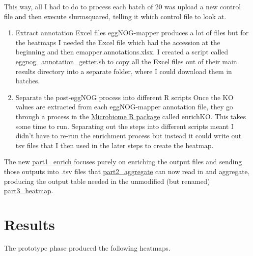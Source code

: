 \documentclass[
  letterpaper,
  DIV=11,
  numbers=noendperiod]{scrreprt}
\begin{document}
This way, all I had to do to process each batch of 20 was upload a new
control file and then execute slurmsquared, telling it which control
file to look at.

\begin{enumerate}
\def\labelenumi{\arabic{enumi}.}
\setcounter{enumi}{3}
\item
  Extract annotation Excel files eggNOG-mapper produces a lot of files
  but for the heatmaps I needed the Excel file which had the accession
  at the beginning and then emapper.annotations.xlsx. I created a script
  called
  \href{https://github.com/tobiasnunn/tnunn_research/blob/main/Research_Experience_Module/00_scripts/Slurmscripts/eggnog_annotation_getter.sh}{eggnog\_annotation\_getter.sh}
  to copy all the Excel files out of their main results directory into a
  separate folder, where I could download them in batches.
\item
  Separate the post-eggNOG process into different R scripts Once the KO
  values are extracted from each eggNOG-mapper annotation file, they go
  through a process in the
  \href{https://bioconductor.org/packages/devel/bioc/vignettes/microbiome/inst/doc/vignette.html}{Microbiome
  R package} called enrichKO. This takes some time to run. Separating
  out the steps into different scripts meant I didn't have to re-run the
  enrichment process but instead it could write out tsv files that I
  then used in the later steps to create the heatmap.
\end{enumerate}

The new
\href{https://github.com/tobiasnunn/tnunn_research/blob/main/Research_Experience_Module/00_scripts/Rscripts/KEGG_pipeline_pt1_enrich.R}{part1\_enrich}
focuses purely on enriching the output files and sending those outputs
into .tsv files that
\href{https://github.com/tobiasnunn/tnunn_research/blob/main/Research_Experience_Module/00_scripts/Rscripts/KEGG_pipeline_pt2_aggregate.R}{part2\_aggregate}
can now read in and aggregate, producing the output table needed in the
unmodified (but renamed)
\href{https://github.com/tobiasnunn/tnunn_research/blob/main/Research_Experience_Module/00_scripts/Rscripts/KEGG_pipeline_pt3_proportionising.R}{part3\_heatmap}.

\section{Results}\label{results-8}

The prototype phase produced the following heatmaps.
\end{document}
